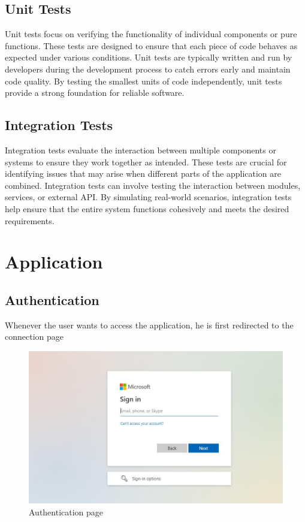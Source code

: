 \documentclass[12pt,a4paper,table,english]{article}
\begin{document}
	
	\subsection{Unit Tests}
	Unit tests focus on verifying the functionality of individual components or pure functions. These tests are designed to ensure that each piece of code behaves as expected under various conditions. Unit tests are typically written and run by developers during the development process to catch errors early and maintain code quality. By testing the smallest units of code independently, unit tests provide a strong foundation for reliable software.
	
	\subsection{Integration Tests}
	Integration tests evaluate the interaction between multiple components or systems to ensure they work together as intended. These tests are crucial for identifying issues that may arise when different parts of the application are combined. Integration tests can involve testing the interaction between modules, services, or external API. By simulating real-world scenarios, integration tests help ensure that the entire system functions cohesively and meets the desired requirements.
	
	\newpage
	
	\section{Application}
	
	\subsection{Authentication}
	Whenever the user wants to access the application, he is first redirected to the connection page
	
	\begin{figure}[H]
		\centering
		\includegraphics[width=150mm]{Image/authentication}
		\caption{Authentication page}
		\label{fig:Authentication page}
	\end{figure}
\end{document}
